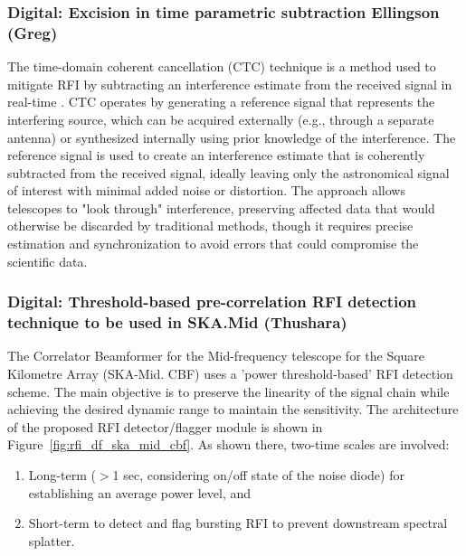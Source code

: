 \subsubsection{Digital: Excision in time parametric subtraction Ellingson (Greg)}

The time-domain coherent cancellation (CTC) technique is a method used to mitigate RFI by subtracting an interference estimate from the received signal in real-time \cite{ellingson2022coherent}. CTC operates by generating a reference signal that represents the interfering source, which can be acquired externally (e.g., through a separate antenna) or synthesized internally using prior knowledge of the interference. The reference signal is used to create an interference estimate that is coherently subtracted from the received signal, ideally leaving only the astronomical signal of interest with minimal added noise or distortion. The approach allows telescopes to "look through" interference, preserving affected data that would otherwise be discarded by traditional methods, though it requires precise estimation and synchronization to avoid errors that could compromise the scientific data.

\subsubsection{Digital: Threshold-based pre-correlation RFI detection technique to be used in SKA.Mid (Thushara)}
\label{subsection:hardware:catalog:ska-mid}

The Correlator Beamformer for the Mid-frequency telescope for the Square Kilometre Array (SKA-Mid. CBF) uses a 'power threshold-based' RFI detection scheme. The main objective is to preserve the linearity of the signal chain while achieving the desired dynamic range to maintain the sensitivity. The architecture of the proposed RFI detector/flagger module is shown in Figure~\ref{fig:rfi_df_ska_mid_cbf}. As shown there, two-time scales are involved:
\begin{enumerate}
    \item Long-term ($>$1 sec, considering on/off state of the noise diode) for establishing an average power level, and
    \item Short-term to detect and flag bursting RFI to prevent downstream spectral splatter.
\end{enumerate}

